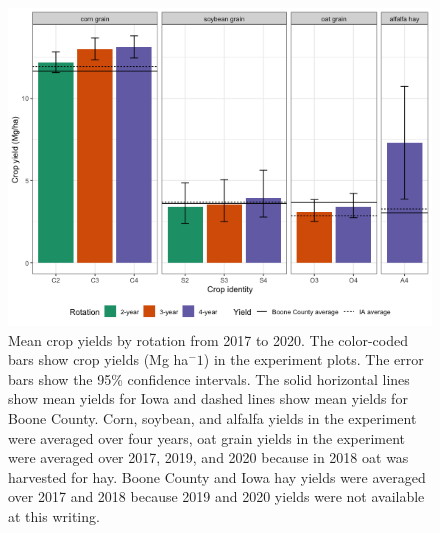 \documentclass[
]{article}
\begin{document}
\begin{figure}
\centering
\includegraphics{Crop_yields_files/figure-latex/crop-bar-1.png}
\caption{\label{fig:crop-bar}Mean crop yields by rotation from 2017 to 2020. The color-coded bars show crop yields (Mg ha\(^-1\)) in the experiment plots. The error bars show the 95\% confidence intervals. The solid horizontal lines show mean yields for Iowa and dashed lines show mean yields for Boone County. Corn, soybean, and alfalfa yields in the experiment were averaged over four years, oat grain yields in the experiment were averaged over 2017, 2019, and 2020 because in 2018 oat was harvested for hay. Boone County and Iowa hay yields were averaged over 2017 and 2018 because 2019 and 2020 yields were not available at this writing.}
\end{figure}
\end{document}
